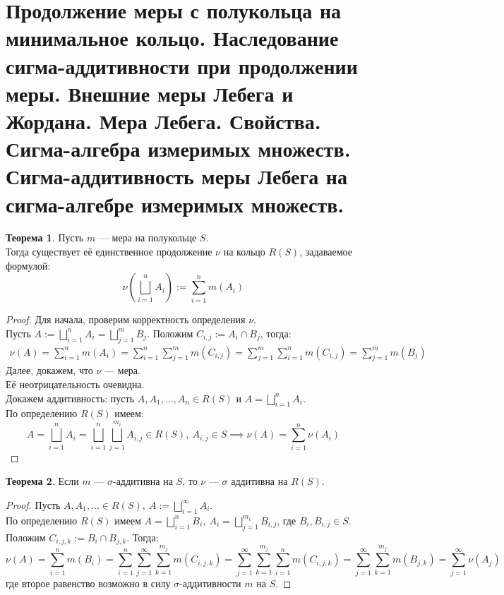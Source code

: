 \documentclass[11pt,a4paper]{report}
\theoremstyle{definition}
\theoremstyle{definition}
\newtheorem{theorem}{Теорема}[section]
\theoremstyle{definition}
\begin{document}
	\section{Продолжение меры с полукольца на минимальное кольцо. Наследование сигма-аддитивности при продолжении меры. Внешние меры Лебега и Жордана. Мера Лебега. Свойства. Сигма-алгебра измеримых множеств. Сигма-аддитивность меры Лебега на сигма-алгебре измеримых множеств.}
	\begin{theorem}
		Пусть $ m $ — мера на полукольце $ S $.\\ 
		Тогда существует её единственное продолжение $ \nu $ на кольцо $ R(S) $, задаваемое формулой:
		\[ \nu\left (\bigsqcup_{i=1}^{n}{A_{i}}\right ) := \sum_{i=1}^{n}{m(A_{i})} \]
	\end{theorem}
	\begin{proof}
		Для начала, проверим корректность определения $ \nu $.\\
		Пусть $ A := \bigsqcup_{i=1}^{n}{A_{i}} = \bigsqcup_{j=1}^{m}{B_{j}} $. Положим $ C_{i, j} := A_{i} \cap B_{j} $, тогда: 
		\begin{gather*}
			\nu(A) = \sum_{i=1}^{n}{m(A_{i})} =   \sum_{i=1}^{n}{\sum_{j=1}^{m}{m(C_{i, j})}} = \sum_{j=1}^{m}{\sum_{i=1}^{n}{m(C_{i, j})}} = \sum_{j=1}^{m}{m(B_{j})}
		\end{gather*}
		Далее, докажем, что $ \nu $ — мера.\\
		Её неотрицательность очевидна.\\
		Докажем аддитивность: пусть $ A, A_{1}, \dots, A_{n} \in R(S) $ и $ A = \bigsqcup_{i=1}^{n}{A_{i}} $.\\
		По определению $ R(S) $ имеем:
	 \[ A = \bigsqcup_{i=1}^{n}{A_{i}} = \bigsqcup_{i=1}^{n}{\bigsqcup_{j=1}^{m_{i}}{A_{i, j}}} \in R(S),\ A_{i, j} \in S \implies \nu(A) = \sum_{i=1}^{n}{\nu(A_{i})} \]
	\end{proof}
	\begin{theorem}
		 Если $ m $ — $ \sigma $-аддитивна на $ S $, то $ \nu $ — $ \sigma $ аддитивна на $ R(S) $.
	\end{theorem}
	\begin{proof}
		Пусть $ A, A_{1}, \dots \in R(S),\ A := \bigsqcup_{i=1}^{\infty}{A_{i}} $.\\
		По определению $ R(S) $ имеем $ A = \bigsqcup_{i=1}^{n}{B_{i}},\ A_{i} = \bigsqcup_{j=1}^{m_{i}}{B_{i, j}} $, где $ B_{i}, B_{i, j} \in S $.\\
		Положим $ C_{i, j, k} := B_{i} \cap B_{j, k} $. Тогда: 
		\[ \nu(A) = \sum_{i=1}^{n}{m(B_{i})} = \sum_{i=1}^{n}{\sum_{j=1}^{\infty}{\sum_{k=1}^{m_{j}}{m(C_{i, j, k})}}} = \sum_{j=1}^{\infty}{\sum_{k=1}^{m_{j}}{\sum_{i=1}^{n}{m(C_{i, j, k})}}} = \sum_{j=1}^{\infty}{\sum_{k=1}^{m_{j}}{m(B_{j, k})}} = \sum_{j=1}^{\infty}{\nu(A_{j})} \]
		где второе равенство возможно в силу $ \sigma $-аддитивности $ m $ на $ S $.
	\end{proof}
\end{document}
